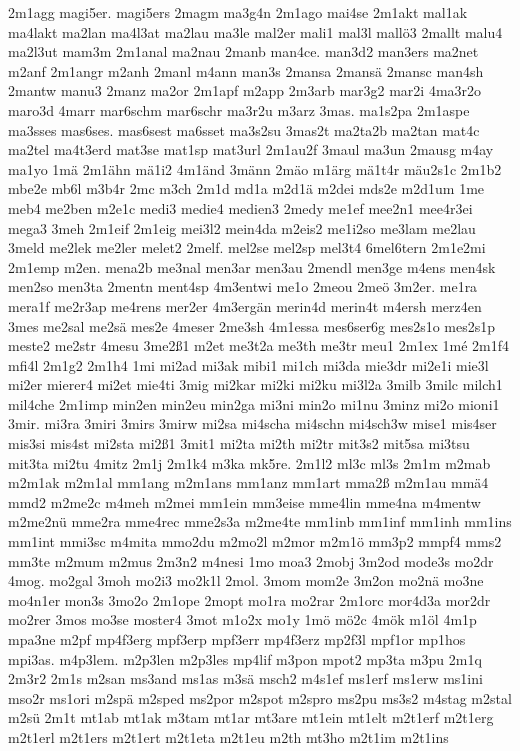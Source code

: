 {2m1agg
magi5er.
magi5ers
2magm
ma3g4n
2m1ago
mai4se
2m1akt
mal1ak
ma4lakt
ma2lan
ma4l3at
ma2lau
ma3le
mal2er
mali1
mal3l
mallö3
2mallt
malu4
ma2l3ut
mam3m
2m1anal
ma2nau
2manb
man4ce.
man3d2
man3ers
ma2net
m2anf
2m1angr
m2anh
2manl
m4ann
man3s
2mansa
2mansä
2mansc
man4sh
2mantw
manu3
2manz
ma2or
2m1apf
m2app
2m3arb
mar3g2
mar2i
4ma3r2o
maro3d
4marr
mar6schm
mar6schr
ma3r2u
m3arz
3mas.
ma1s2pa
2m1aspe
ma3sses
mas6ses.
mas6sest
ma6sset
ma3s2su
3mas2t
ma2ta2b
ma2tan
mat4c
ma2tel
ma4t3erd
mat3se
mat1sp
mat3url
2m1au2f
3maul
ma3un
2mausg
m4ay
ma1yo
1mä
2m1ähn
mä1i2
4m1änd
3männ
2mäo
m1ärg
mä1t4r
mäu2s1c
2m1b2
mbe2e
mb6l
m3b4r
2mc
m3ch
2m1d
md1a
m2d1ä
m2dei
mds2e
m2d1um
1me
meb4
me2ben
m2e1c
medi3
medie4
medien3
2medy
me1ef
mee2n1
mee4r3ei
mega3
3meh
2m1eif
2m1eig
mei3l2
mein4da
m2eis2
me1i2so
me3lam
me2lau
3meld
me2lek
me2ler
melet2
2melf.
mel2se
mel2sp
mel3t4
6mel6tern
2m1e2mi
2m1emp
m2en.
mena2b
me3nal
men3ar
men3au
2mendl
men3ge
m4ens
men4sk
men2so
men3ta
2mentn
ment4sp
4m3entwi
me1o
2meou
2meö
3m2er.
me1ra
mera1f
me2r3ap
me4rens
mer2er
4m3ergän
merin4d
merin4t
m4ersh
merz4en
3mes
me2sal
me2sä
mes2e
4meser
2me3sh
4m1essa
mes6ser6g
mes2s1o
mes2s1p
meste2
me2str
4mesu
3me2ß1
m2et
me3t2a
me3th
me3tr
meu1
2m1ex
1mé
2m1f4
mfi4l
2m1g2
2m1h4
1mi
mi2ad
mi3ak
mibi1
mi1ch
mi3da
mie3dr
mi2e1i
mie3l
mi2er
mierer4
mi2et
mie4ti
3mig
mi2kar
mi2ki
mi2ku
mi3l2a
3milb
3milc
milch1
mil4che
2m1imp
min2en
min2eu
min2ga
mi3ni
min2o
mi1nu
3minz
mi2o
mioni1
3mir.
mi3ra
3miri
3mirs
3mirw
mi2sa
mi4scha
mi4schn
mi4sch3w
mise1
mis4ser
mis3si
mis4st
mi2sta
mi2ß1
3mit1
mi2ta
mi2th
mi2tr
mit3s2
mit5sa
mi3tsu
mit3ta
mi2tu
4mitz
2m1j
2m1k4
m3ka
mk5re.
2m1l2
ml3c
ml3s
2m1m
m2mab
m2m1ak
m2m1al
mm1ang
m2m1ans
mm1anz
mm1art
mma2ß
m2m1au
mmä4
mmd2
m2me2c
m4meh
m2mei
mm1ein
mm3eise
mme4lin
mme4na
m4mentw
m2me2nü
mme2ra
mme4rec
mme2s3a
m2me4te
mm1inb
mm1inf
mm1inh
mm1ins
mm1int
mmi3sc
m4mita
mmo2du
m2mo2l
m2mor
m2m1ö
mm3p2
mmpf4
mms2
mm3te
m2mum
m2mus
2m3n2
m4nesi
1mo
moa3
2mobj
3m2od
mode3s
mo2dr
4mog.
mo2gal
3moh
mo2i3
mo2k1l
2mol.
3mom
mom2e
3m2on
mo2nä
mo3ne
mo4n1er
mon3s
3mo2o
2m1ope
2mopt
mo1ra
mo2rar
2m1orc
mor4d3a
mor2dr
mo2rer
3mos
mo3se
moster4
3mot
m1o2x
mo1y
1mö
mö2c
4mök
m1öl
4m1p
mpa3ne
m2pf
mp4f3erg
mpf3erp
mpf3err
mp4f3erz
mp2f3l
mpf1or
mp1hos
mpi3as.
m4p3lem.
m2p3len
m2p3les
mp4lif
m3pon
mpot2
mp3ta
m3pu
2m1q
2m3r2
2m1s
m2san
ms3and
ms1as
m3sä
msch2
m4s1ef
ms1erf
ms1erw
ms1ini
mso2r
ms1ori
m2spä
m2sped
ms2por
m2spot
m2spro
ms2pu
ms3s2
m4stag
m2stal
m2sü
2m1t
mt1ab
mt1ak
m3tam
mt1ar
mt3are
mt1ein
mt1elt
m2t1erf
m2t1erg
m2t1erl
m2t1ers
m2t1ert
m2t1eta
m2t1eu
m2th
mt3ho
m2t1im
m2t1ins
}
